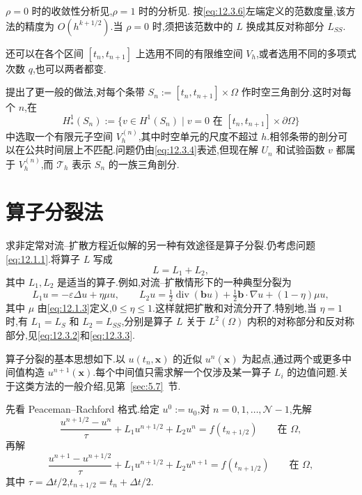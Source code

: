\(\rho=0\) 时的收敛性分析见,\(\rho=1\) 时的分析见.
按\eqref{eq:12.3.6}左端定义的范数度量,该方法的精度为 \(O(h^{k+1/2})\).当 \(\rho=0\) 时,须把该范数中的 \(L\) 换成其反对称部分 \(L_{SS}\).

还可以在各个区间 \([t_n,t_{n+1}]\) 上选用不同的有限维空间 \(V_h\),或者选用不同的多项式次数 \(q\),也可以两者都变.

提出了更一般的做法,对每个条带 \(S_n:=[t_n,t_{n+1}]\times\Omega\) 作时空三角剖分.这时对每个 \(n\),在
\[
  H_*^1(S_n):=\{v\in H^1(S_n)\mid v=0\text{ 在 }[t_n,t_{n+1}]\times\partial\Omega\}
\]
中选取一个有限元子空间 \(V_h^{(n)}\),其中时空单元的尺度不超过 \(h\).相邻条带的剖分可以在公共时间层上不匹配.问题仍由\eqref{eq:12.3.4}表述,但现在解 \(U_n\) 和试验函数 \(v\) 都属于 \(V_h^{(n)}\),而 \(\mathcal T_h\) 表示 \(S_n\) 的一族三角剖分.

\section{算子分裂法}\label{sec:12.4}

求非定常对流--扩散方程近似解的另一种有效途径是算子分裂.仍考虑问题\eqref{eq:12.1.1}.将算子 \(L\) 写成
\begin{equation}\label{eq:12.4.1}
  L=L_1+L_2,
\end{equation}
其中 \(L_1,L_2\) 是适当的算子.例如,对流--扩散情形下的一种典型分裂为
\begin{equation}\label{eq:12.4.2}
  L_1u=-\varepsilon\Delta u+\eta\mu u,\qquad
  L_2u=\tfrac12\operatorname{div}(\boldsymbol{b}u)
          +\tfrac12\boldsymbol{b}\cdot\nabla u+(1-\eta)\mu u,
\end{equation}
其中 \(\mu\) 由\eqref{eq:12.1.3}定义,\(0\le\eta\le1\).这样就把扩散和对流分开了.特别地,当 \(\eta=1\) 时,有 \(L_1=L_S\) 和 \(L_2=L_{SS}\),分别是算子 \(L\) 关于 \(L^2(\Omega)\) 内积的对称部分和反对称部分,见\eqref{eq:12.3.2}和\eqref{eq:12.3.3}.

算子分裂的基本思想如下.以 \(u(t_n,\boldsymbol{x})\) 的近似 \(u^n(\boldsymbol{x})\) 为起点,通过两个或更多中间值构造 \(u^{n+1}(\boldsymbol{x})\).每个中间值只需求解一个仅涉及某一算子 \(L_i\) 的边值问题.关于这类方法的一般介绍,见第~\ref{sec:5.7}~节.

先看 Peaceman--Rachford 格式.给定 \(u^0:=u_0\),对 \(n=0,1,\ldots,\mathcal N-1\),先解
\begin{equation}\label{eq:12.4.3}
  \frac{u^{n+1/2}-u^n}{\tau}+L_1u^{n+1/2}+L_2u^n
    =f(t_{n+1/2})\qquad\text{在 }\Omega,
\end{equation}
再解
\begin{equation}\label{eq:12.4.4}
  \frac{u^{n+1}-u^{n+1/2}}{\tau}+L_1u^{n+1/2}+L_2u^{n+1}
    =f(t_{n+1/2})\qquad\text{在 }\Omega,
\end{equation}
其中 \(\tau=\Delta t/2\),\(t_{n+1/2}=t_n+\Delta t/2\).


